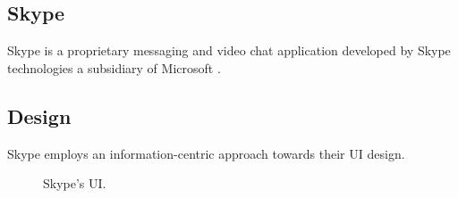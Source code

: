 \subsection{Skype}

Skype is a proprietary messaging and video chat application
developed by Skype technologies a subsidiary of Microsoft
\cite{skype}.

\subsection*{Design}

Skype employs an information-centric approach towards their UI
design.

\begin{figure}[H]

\centering
    \qquad
\centering

\caption{Skype's UI.}
\label{fig:Skype}
\end{figure}

